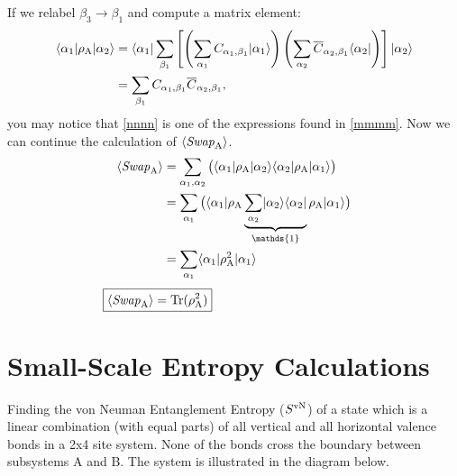 If we relabel $\beta_3 \rightarrow \beta_1$ and compute a matrix element:
\begin{align}
	\langle {\alpha_1} \rvert\rho_{\rm A} \lvert {\alpha_2} \rangle
	&=   \langle {\alpha_1} \rvert\sum_{\beta_1}  \left[ \left(\sum_{\alpha_1} 
		C_{\alpha_1,\beta_1}\lvert {\alpha_1} \rangle\right)
		\left(\sum_{\alpha_2} 
		\overline{C}_{\alpha_2,\beta_1}\langle {\alpha_2} \rvert\right) \right] \lvert {\alpha_2} \rangle \\
	&= \sum_{\beta_1} C_{\alpha_1,\beta_1} \overline{C}_{\alpha_2,\beta_1} \label{nnnn},
\end{align}
you may notice that \eqref{nnnn} is one of the expressions found in \eqref{mmmm}.
Now we can continue the calculation of $\langle {\it Swap}_{\rm A} \rangle$.
\begin{align}
\langle \SWA \rangle &= \sum_{\alpha_1,\alpha_2} \big( \bra{\alpha_1}\rho_{\rm A} \ket{\alpha_2} 
					\bra{\alpha_2}\rho_{\rm A} \ket{\alpha_1}\big) \\
	&= \sum_{\alpha_1} \big( \bra{\alpha_1}\rho_{\rm A} 
				\underbrace{\sum_{\alpha_2} \ket{\alpha_2}\bra{\alpha_2}}_{\mathds{1}}
				\rho_{\rm A} \ket{\alpha_1}\big) \\
	&= \sum_{\alpha_1} \bra{\alpha_1}\rho_{\rm A}^2  \ket{\alpha_1}
\end{align}
\vspace{-5mm}
\begin{align}
	\hspace{-3.3cm}\boxed{\langle \SWA \rangle= {\rm Tr (\rho_A^2)}} \hspace{1cm}
\end{align}

\chapter{Small-Scale Entropy Calculations}
\label{small}
\newcommand{\ra}{\rangle}
\newcommand{\la}{\langle}
\newcommand{\ox}{\otimes}
\newcommand{\singlet}[2]{\left( \mid \up_#1 \dw_#2 \ra - \mid \dw_#1 \up_#2 \ra \right) }
\newcommand{\kb}[2]{\mid \! #1 \ra \la #2 \!\mid}

Finding the von Neuman Entanglement Entropy ($S^{\rm vN}$) of a state which is a linear combination (with equal parts) of all vertical and all horizontal valence bonds in a 2x4 site system.
None of the bonds cross the boundary between subsystems A and B.  
The system is illustrated in the diagram below.\\ 

